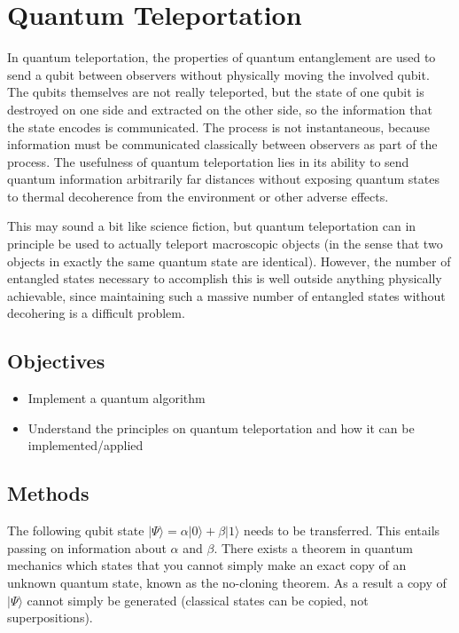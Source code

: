 \renewcommand{\chaptername}{March 15th: Lab}
\chapter{Quantum Teleportation}
In quantum teleportation, the properties of quantum entanglement are used to send a qubit between observers without physically moving the involved qubit. The qubits themselves are not really teleported, but the state of one qubit is destroyed on one side and extracted on the other side, so the information that the state encodes is communicated. The process is not instantaneous, because information must be communicated classically between observers as part of the process. The usefulness of quantum teleportation lies in its ability to send quantum information arbitrarily far distances without exposing quantum states to thermal decoherence from the environment or other adverse effects.

This may sound a bit like science fiction, but quantum teleportation can in principle be used to actually teleport macroscopic objects (in the sense that two objects in exactly the same quantum state are identical). However, the number of entangled states necessary to accomplish this is well outside anything physically achievable, since maintaining such a massive number of entangled states without decohering is a difficult problem.

\section{Objectives}

\begin{itemize}
    \item Implement a quantum algorithm
    \item Understand the principles on quantum teleportation and how it can be implemented/applied
\end{itemize}

\section{Methods}

The following qubit state  $|\Psi \rangle = \alpha |0 \rangle + \beta |1 \rangle$ needs to be transferred. This entails passing on information about $\alpha$ and $\beta$. There exists a theorem in quantum mechanics which states that you cannot simply make an exact copy of an unknown quantum state, known as the no-cloning theorem. As a result a copy of  $|\Psi \rangle$ cannot simply be generated (classical states can be copied, not superpositions).

